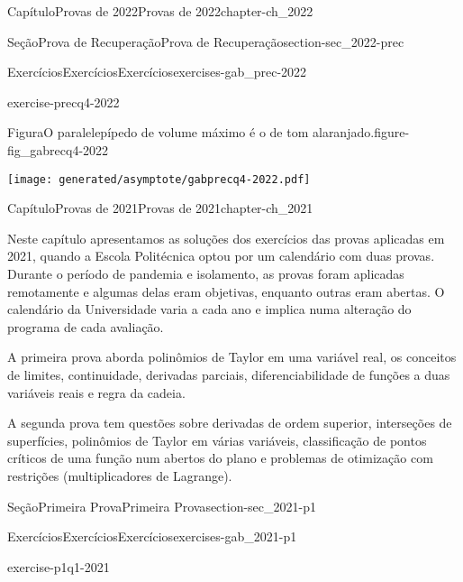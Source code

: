 \documentclass[oneside,10pt,]{book}
\numberwithin{equation}{section}
\begin{document}
\begin{chapterptx}{Capítulo}{Provas de 2022}{}{Provas de 2022}{}{}{chapter-ch_2022}
\begin{sectionptx}{Seção}{Prova de Recuperação}{}{Prova de Recuperação}{}{}{section-sec_2022-prec}
\begin{exercises-subsection-numberless}{Exercícios}{Exercícios}{}{Exercícios}{}{}{exercises-gab_prec-2022}
\begin{divisionexercise}{4}{}{}{exercise-precq4-2022}
\begin{figureptx}{Figura}{O paralelepípedo de volume máximo é o de tom alaranjado.}{figure-fig_gabrecq4-2022}{}
\begin{image}{0.25}{0.5}{0.25}{}%
\texttt{[image: generated/asymptote/gabprecq4-2022.pdf]}
\end{image}%
\tcblower
\end{figureptx}%
\end{divisionexercise}%
\end{exercises-subsection-numberless}
\end{sectionptx}
\end{chapterptx}
%
%
\typeout{************************************************}
\typeout{************************************************}
%
\begin{chapterptx}{Capítulo}{Provas de 2021}{}{Provas de 2021}{}{}{chapter-ch_2021}
\renewcommand*{\chaptername}{Capítulo}
\begin{introduction}{}%
Neste capítulo apresentamos as soluções dos exercícios das provas aplicadas em 2021, quando a Escola Politécnica optou por um calendário com duas provas. Durante o período de pandemia e isolamento, as provas foram aplicadas remotamente e algumas delas eram objetivas, enquanto outras eram abertas. O calendário da Universidade varia a cada ano e implica numa alteração do programa de cada avaliação.%
\par
A primeira prova aborda polinômios de Taylor em uma variável real, os conceitos de limites, continuidade, derivadas parciais, diferenciabilidade de funções a duas variáveis reais e regra da cadeia.%
\par
A segunda prova tem questões sobre derivadas de ordem superior, interseções de superfícies, polinômios de Taylor em várias variáveis, classificação de pontos críticos de uma função num abertos do plano e problemas de otimização com restrições (multiplicadores de Lagrange).%
\end{introduction}%
%
%
\typeout{************************************************}
\typeout{************************************************}
%
\begin{sectionptx}{Seção}{Primeira Prova}{}{Primeira Prova}{}{}{section-sec_2021-p1}
%
%
\typeout{************************************************}
\typeout{************************************************}
%
\begin{exercises-subsection-numberless}{Exercícios}{Exercícios}{}{Exercícios}{}{}{exercises-gab_2021-p1}
\begin{divisionexercise}{1}{}{}{exercise-p1q1-2021}%

\end{divisionexercise}
\end{exercises-subsection-numberless}
\end{sectionptx}
\end{chapterptx}
\end{document}
